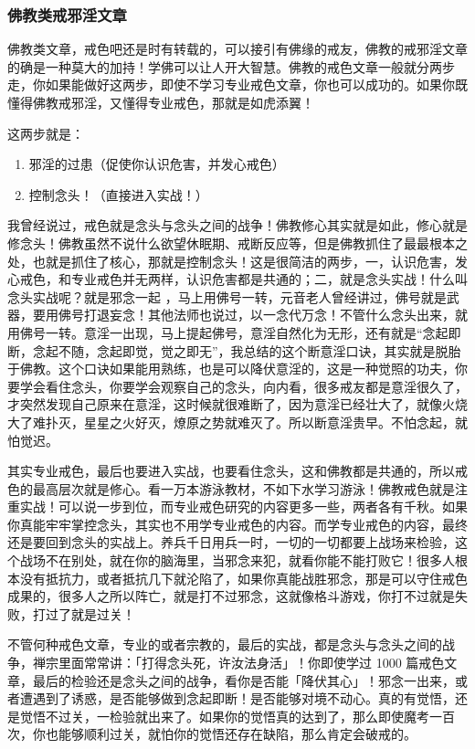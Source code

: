 \subsubsection{佛教类戒邪淫文章}

佛教类文章，戒色吧还是时有转载的，可以接引有佛缘的戒友，佛教的戒邪淫文章的确是一种莫大的加持！学佛可以让人开大智慧。佛教的戒色文章一般就分两步走，你如果能做好这两步，即使不学习专业戒色文章，你也可以成功的。如果你既懂得佛教戒邪淫，又懂得专业戒色，那就是如虎添翼！

这两步就是：

\begin{enumerate}
    \item 邪淫的过患（促使你认识危害，并发心戒色）
    \item 控制念头！（直接进入实战！）
\end{enumerate}

我曾经说过，戒色就是念头与念头之间的战争！佛教修心其实就是如此，修心就是修念头！佛教虽然不说什么欲望休眠期、戒断反应等，但是佛教抓住了最最根本之处，也就是抓住了核心，那就是控制念头！这是很简洁的两步，一，认识危害，发心戒色，和专业戒色并无两样，认识危害都是共通的；二，就是念头实战！什么叫念头实战呢？就是邪念一起 ，马上用佛号一转，元音老人曾经讲过，佛号就是武器，要用佛号打退妄念！其他法师也说过，以一念代万念！不管什么念头出来，就用佛号一转。意淫一出现，马上提起佛号，意淫自然化为无形，还有就是“念起即断，念起不随，念起即觉，觉之即无”，我总结的这个断意淫口诀，其实就是脱胎于佛教。这个口诀如果能用熟练，也是可以降伏意淫的，这是一种觉照的功夫，你要学会看住念头，你要学会观察自己的念头，向内看，很多戒友都是意淫很久了，才突然发现自己原来在意淫，这时候就很难断了，因为意淫已经壮大了，就像火烧大了难扑灭，星星之火好灭，燎原之势就难灭了。所以断意淫贵早。不怕念起，就怕觉迟。

其实专业戒色，最后也要进入实战，也要看住念头，这和佛教都是共通的，所以戒色的最高层次就是修心。看一万本游泳教材，不如下水学习游泳！佛教戒色就是注重实战！可以说一步到位，而专业戒色研究的内容更多一些，两者各有千秋。如果你真能牢牢掌控念头，其实也不用学专业戒色的内容。而学专业戒色的内容，最终还是要回到念头的实战上。养兵千日用兵一时，一切的一切都要上战场来检验，这个战场不在别处，就在你的脑海里，当邪念来犯，就看你能不能打败它！很多人根本没有抵抗力，或者抵抗几下就沦陷了，如果你真能战胜邪念，那是可以守住戒色成果的，很多人之所以阵亡，就是打不过邪念，这就像格斗游戏，你打不过就是失败，打过了就是过关！

不管何种戒色文章，专业的或者宗教的，最后的实战，都是念头与念头之间的战争，禅宗里面常常讲：「打得念头死，许汝法身活」！你即使学过 1000 篇戒色文章，最后的检验还是念头之间的战争，看你是否能「降伏其心」！邪念一出来，或者遭遇到了诱惑，是否能够做到念起即断！是否能够对境不动心。真的有觉悟，还是觉悟不过关，一检验就出来了。如果你的觉悟真的达到了，那么即使魔考一百次，你也能够顺利过关，就怕你的觉悟还存在缺陷，那么肯定会破戒的。

